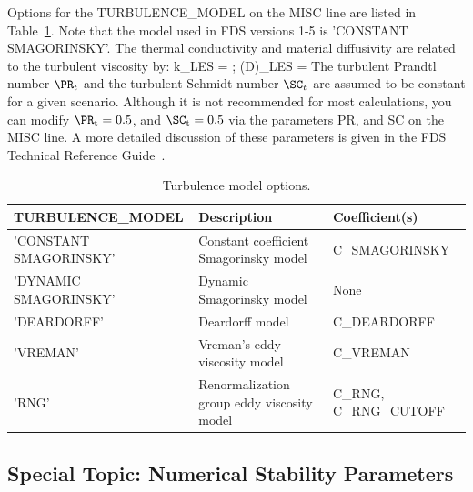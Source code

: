 \documentclass[11pt]{book}
\begin{document}
Options for the {\ct TURBULENCE\_MODEL} on the {\ct MISC} line are listed in Table~\ref{turb_table}. Note that the model used in FDS versions 1-5 is {\ct 'CONSTANT SMAGORINSKY'}. The thermal conductivity and material diffusivity are related to the turbulent viscosity by:
\be
   k_{\hbox{\tiny LES}} = 
   \quad ; \quad  (\rho D)_{\hbox{\tiny LES}} =
\ee
The turbulent Prandtl number $\PR_t$ and the turbulent Schmidt number $\SC_t$ are assumed to be constant for a given scenario. Although it is not recommended for most calculations, you can modify $\PR_{\rm t}=0.5$, and $\SC_{\rm t}=0.5$ via the parameters {\ct PR}, and {\ct SC} on the {\ct MISC} line. A more detailed discussion of these parameters is given in the FDS Technical Reference Guide~\cite{FDS_Math_Guide}.

\begin{table}[ht]
\caption[Turbulence model options]{Turbulence model options.}
\label{turb_table}
\begin{center}
\begin{tabular}{|lll|}
\hline
{\ct TURBULENCE\_MODEL} \hfill  & Description    \hfill                                         & Coefficient(s)  \hfill  \\ \hline
{\ct 'CONSTANT SMAGORINSKY'}    & Constant coefficient Smagorinsky model \cite{Smagorinsky:1}   & {\ct C\_SMAGORINSKY}  \\
{\ct 'DYNAMIC SMAGORINSKY'}     & Dynamic Smagorinsky model \cite{Germano:1991,Moin:1991}       & None                  \\
{\ct 'DEARDORFF'}               & Deardorff model \cite{Deardorff:1980,Pope:2000}               & {\ct C\_DEARDORFF}    \\
{\ct 'VREMAN'}                  & Vreman's eddy viscosity model \cite{Vreman:2004}              & {\ct C\_VREMAN}       \\
{\ct 'RNG'}                     & Renormalization group eddy viscosity model \cite{Yakhot:1989} & {\ct C\_RNG}, {\ct C\_RNG\_CUTOFF} \\ \hline
\end{tabular}
\end{center}
\end{table}








\subsection{Special Topic: Numerical Stability Parameters}
\label{info:CFL}
\end{document}
